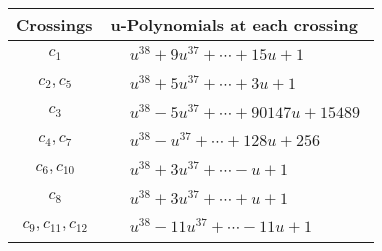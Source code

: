 \documentclass[1p]{elsarticle_modified}
\theoremstyle{definition}
\begin{document}
\begin{tabular}{m{50pt}|m{274pt}}
Crossings & \hspace{64pt}u-Polynomials at each crossing \\
\hline $$\begin{aligned}c_{1}\end{aligned}$$&$\begin{aligned}
&u^{38}+9 u^{37}+\cdots+15 u+1
\end{aligned}$\\
\hline $$\begin{aligned}c_{2},c_{5}\end{aligned}$$&$\begin{aligned}
&u^{38}+5 u^{37}+\cdots+3 u+1
\end{aligned}$\\
\hline $$\begin{aligned}c_{3}\end{aligned}$$&$\begin{aligned}
&u^{38}-5 u^{37}+\cdots+90147 u+15489
\end{aligned}$\\
\hline $$\begin{aligned}c_{4},c_{7}\end{aligned}$$&$\begin{aligned}
&u^{38}- u^{37}+\cdots+128 u+256
\end{aligned}$\\
\hline $$\begin{aligned}c_{6},c_{10}\end{aligned}$$&$\begin{aligned}
&u^{38}+3 u^{37}+\cdots- u+1
\end{aligned}$\\
\hline $$\begin{aligned}c_{8}\end{aligned}$$&$\begin{aligned}
&u^{38}+3 u^{37}+\cdots+u+1
\end{aligned}$\\
\hline $$\begin{aligned}c_{9},c_{11},c_{12}\end{aligned}$$&$\begin{aligned}
&u^{38}-11 u^{37}+\cdots-11 u+1
\end{aligned}$\\
\hline
\end{tabular}\\~\\
\newpage\renewcommand{\arraystretch}{1}
\end{document}

